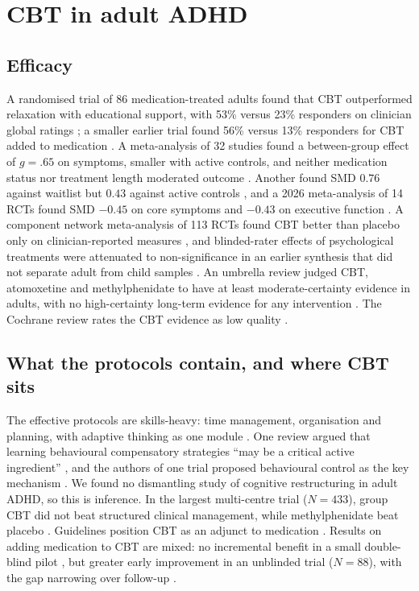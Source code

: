 \section{CBT in adult ADHD}\label{sec:adhdcbt}
\subsection{Efficacy}
A randomised trial of 86 medication-treated adults found that CBT outperformed relaxation with educational support, with 53\% versus 23\% responders on clinician global ratings \citep{safren2010cbt}; a smaller earlier trial found 56\% versus 13\% responders for CBT added to medication \citep{safren2005cbt}. A meta-analysis of 32 studies found a between-group effect of $g=.65$ on symptoms, smaller with active controls, and neither medication status nor treatment length moderated outcome \citep{knouse2017meta}. Another found SMD $0.76$ against waitlist but $0.43$ against active controls \citep{young2020cbt}, and a 2026 meta-analysis of 14 RCTs found SMD $-0.45$ on core symptoms and $-0.43$ on executive function \citep{liu2026cbt}. A component network meta-analysis of 113 RCTs found CBT better than placebo only on clinician-reported measures \citep{ostinelli2025adultnma}, and blinded-rater effects of psychological treatments were attenuated to non-significance in an earlier synthesis that did not separate adult from child samples \citep{sonugabarke2013nonpharm}. An umbrella review judged CBT, atomoxetine and methylphenidate to have at least moderate-certainty evidence in adults, with no high-certainty long-term evidence for any intervention \citep{gosling2025umbrella}. The Cochrane review rates the CBT evidence as low quality \citep{lopez2018cochrane}.

\subsection{What the protocols contain, and where CBT sits}
The effective protocols are skills-heavy: time management, organisation and planning, with adaptive thinking as one module \citep{safren2010cbt,solanto2010metacognitive}. One review argued that learning behavioural compensatory strategies ``may be a critical active ingredient'' \citep{knouse2010current}, and the authors of one trial proposed behavioural control as the key mechanism \citep{young2017functional}. We found no dismantling study of cognitive restructuring in adult ADHD, so this is inference. In the largest multi-centre trial ($N=433$), group CBT did not beat structured clinical management, while methylphenidate beat placebo \citep{philipsen2015group}. Guidelines position CBT as an adjunct to medication \citep{kooij2019european,nice2018ng87}. Results on adding medication to CBT are mixed: no incremental benefit in a small double-blind pilot \citep{weiss2012cbt}, but greater early improvement in an unblinded trial ($N=88$), with the gap narrowing over follow-up \citep{cherkasova2020cbtmed}.

